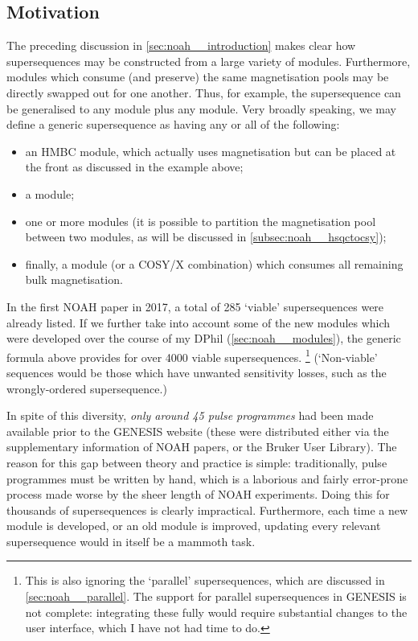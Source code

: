 \subsection{Motivation}
\label{subsec:noah__genesis_motivation}

The preceding discussion in \cref{sec:noah__introduction} makes clear how supersequences may be constructed from a large variety of modules.
Furthermore, modules which consume (and preserve) the same magnetisation pools may be directly swapped out for one another.
Thus, for example, the  supersequence can be generalised to any  module plus any  module.
Very broadly speaking, we may define a generic supersequence as having any or all of the following:

\begin{itemize}
    \item an HMBC module, which actually uses  magnetisation but can be placed at the front as discussed in the  example above;
    \item a  module;
    \item one or more  modules (it is possible to partition the  magnetisation pool between two modules, as will be discussed in \cref{subsec:noah__hsqctocsy});
    \item finally, a  module (or a COSY/X combination) which consumes all remaining bulk magnetisation.
\end{itemize}

In the first NOAH paper in 2017\autocite{Kupce2017ACIE}, a total of 285 `viable' supersequences were already listed.
If we further take into account some of the new modules which were developed over the course of my DPhil (\cref{sec:noah__modules}), the generic formula above provides for over 4000 viable supersequences.%
\footnote{This is also ignoring the `parallel' supersequences, which are discussed in \cref{sec:noah__parallel}. The support for parallel supersequences in GENESIS is not complete: integrating these fully would require substantial changes to the user interface, which I have not had time to do.}
(`Non-viable' sequences would be those which have unwanted sensitivity losses, such as the wrongly-ordered  supersequence.)

In spite of this diversity, \textit{only around 45 pulse programmes} had been made available prior to the GENESIS website (these were distributed either via the supplementary information of NOAH papers, or the Bruker User Library).
The reason for this gap between theory and practice is simple: traditionally, pulse programmes must be written by hand, which is a laborious and fairly error-prone process made worse by the sheer length of NOAH experiments.
Doing this for thousands of supersequences is clearly impractical.
Furthermore, each time a new module is developed, or an old module is improved, updating every relevant supersequence would in itself be a mammoth task.

